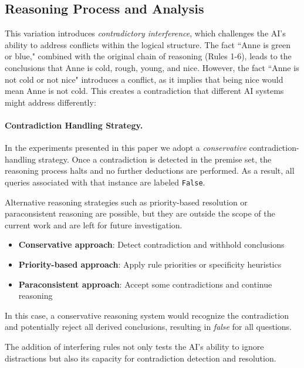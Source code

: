\documentclass{article}
\begin{document}
\subsection{Reasoning Process and Analysis}

    This variation introduces \textit{contradictory interference}, which challenges the AI's ability to address conflicts within the logical structure. The fact ``Anne is green or blue," combined with the original chain of reasoning (Rules 1-6), leads to the conclusions that Anne is cold, rough, young, and nice. However, the fact ``Anne is not cold or not nice" introduces a conflict, as it implies that being nice would mean Anne is not cold. This creates a contradiction that different AI systems might address differently:

\paragraph{Contradiction Handling Strategy.}

In the experiments presented in this paper we adopt a \textit{conservative}
contradiction-handling strategy. Once a contradiction is detected in the
premise set, the reasoning process halts and no further deductions are
performed. As a result, all queries associated with that instance are
labeled \texttt{False}.

Alternative reasoning strategies such as priority-based resolution or
paraconsistent reasoning are possible, but they are outside the scope
of the current work and are left for future investigation.

\begin{itemize}
    \item \textbf{Conservative approach}: Detect contradiction and withhold conclusions
    \item \textbf{Priority-based approach}: Apply rule priorities or specificity heuristics
    \item \textbf{Paraconsistent approach}: Accept some contradictions and continue reasoning
\end{itemize}

In this case, a conservative reasoning system would recognize the contradiction and potentially reject all derived conclusions, resulting in \textit{false} for all questions.

 The addition of interfering rules not only tests the AI's ability to ignore distractions but also its capacity for contradiction detection and resolution.
\end{document}
